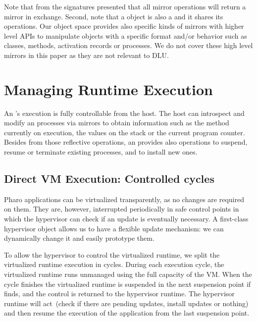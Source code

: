 Note that from the signatures presented that all mirror operations will return a mirror in exchange. Second, note that a  object is also a  and it shares its operations.
Our object space provides also specific kinds of mirrors with higher level APIs to manipulate objects with a specific format and/or behavior such as classes, methods, activation records or processes. We do not cover these high level mirrors in this paper as they are not relevant to DLU.


\section{Managing Runtime Execution} \label{sec:execution}

An \objectspace's execution is fully controllable from the host. The host can introspect and modify an \objectspace processes via mirrors to obtain information such as the method currently on execution, the values on the stack or the current program counter. Besides from those reflective operations, an \objectspace provides also operations to suspend, resume or terminate existing processes, and to install new ones.

\subsection{Direct VM Execution: Controlled cycles}

Pharo applications can be virtualized transparently, as no changes are required on them. They are, however, interrupted periodically in safe control points in which the hypervisor can check if an update is eventually necessary. A first-class hypervisor object allows us to have a flexible update mechanism: we can dynamically change it and easily prototype them.

To allow the hypervisor to control the virtualized runtime, we split the virtualized runtime execution in cycles. During each execution cycle, the virtualized runtime runs unmanaged using the full capacity of the VM. When the cycle finishes the virtualized runtime is suspended in the next suspension point if finds, and the control is returned to the hypervisor runtime. The hypervisor runtime will act~(check if there are pending updates, install updates or nothing) and then resume the execution of the application from the last suspension point.

